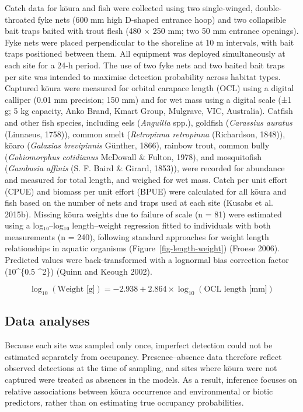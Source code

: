 \documentclass[
  12pt,
  a4paper,
  oneside]{scrbook}
\begin{document}
Catch data for kōura and fish were collected using two single-winged,
double-throated fyke nets (600 mm high D-shaped entrance hoop) and two
collapsible bait traps baited with trout flesh (480 × 250 mm; two 50 mm
entrance openings). Fyke nets were placed perpendicular to the shoreline
at 10 m intervals, with bait traps positioned between them. All
equipment was deployed simultaneously at each site for a 24-h period.
The use of two fyke nets and two baited bait traps per site was intended
to maximise detection probability across habitat types. Captured kōura
were measured for orbital carapace length (OCL) using a digital calliper
(0.01 mm precision; 150 mm) and for wet mass using a digital scale (±1
g; 5 kg capacity, Anko Brand, Kmart Group, Mulgrave, VIC, Australia).
Catfish and other fish species, including eels (\emph{Anguilla} spp.),
goldfish (\emph{Carassius auratus} (Linnaeus, 1758)), common smelt
(\emph{Retropinna retropinna} (Richardson, 1848)), kōaro (\emph{Galaxias
brevipinnis} Günther, 1866), rainbow trout, common bully
(\emph{Gobiomorphus cotidianus} McDowall \& Fulton, 1978), and
mosquitofish (\emph{Gambusia affinis} (S. F. Baird \& Girard, 1853)),
were recorded for abundance and measured for total length, and weighed
for wet mass. Catch per unit effort (CPUE) and biomass per unit effort
(BPUE) were calculated for all kōura and fish based on the number of
nets and traps used at each site (Kusabs et al. 2015b). Missing kōura
weights due to failure of scale (n = 81) were estimated using a
log₁₀--log₁₀ length--weight regression fitted to individuals with both
measurements (n = 240), following standard approaches for weight length
relationships in aquatic organisms (Figure~\ref{fig-length-weight})
(Froese 2006). Predicted values were back-transformed with a lognormal
bias correction factor (10\^{}\{0.5 \cdot \sigma\^{}2\}) (Quinn and
Keough 2002).

\[
\log_{10}(\text{Weight [g]}) = -2.938 + 2.864 \times \log_{10}(\text{OCL length [mm]})
\]

\subsection{Data analyses}\label{data-analyses}

Because each site was sampled only once, imperfect detection could not
be estimated separately from occupancy. Presence--absence data therefore
reflect observed detections at the time of sampling, and sites where
kōura were not captured were treated as absences in the models. As a
result, inference focuses on relative associations between kōura
occurrence and environmental or biotic predictors, rather than on
estimating true occupancy probabilities.
\end{document}
